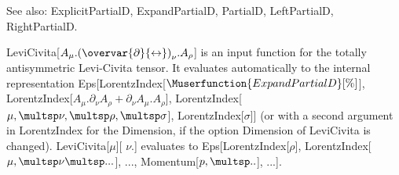 See also:  ExplicitPartialD, ExpandPartialD, PartialD, LeftPartialD, RightPartialD.


\dispSFinmath{
\mu
}

\dispSFoutmath{
\mu
}

\dispSFinmath{
\mu
}


\dispSFinmath{
{{\left( \overvar{\partial }{\leftrightarrow } \right) }_{\mu }}
}


\dispSFinmath{
{{\left( \overvar{\partial }{\leftarrow } \right) }_{\mu }}+{{\left( \overvar{\partial }{\rightarrow } \right) }_{\mu }}
}








LeviCivita[\({A_{\mu }}.{{\left( \overvar{\partial }{\leftrightarrow } \right) }_{\nu }}.{A_{\rho }}\)] is an input function for the totally antisymmetric
Levi-Civita tensor. It evaluates automatically to the internal representation
  Eps[LorentzIndex[\(\Muserfunction{ExpandPartialD}[\%]\)], LorentzIndex[\({A_{\mu }}.{{\partial }_{\nu }}A_{\rho }^{ }+{{\partial }_{\nu }}A_{\mu
}^{ }.{A_{\rho }}\)], LorentzIndex[\(\mu ,\multsp \nu ,\multsp \rho ,\multsp \sigma \)], LorentzIndex[\(\sigma \)]] (or with a second argument
in LorentzIndex for the Dimension, if the option Dimension of LeviCivita is
  changed). LeviCivita[\(\mu \)][ \(\nu \).] evaluates to Eps[LorentzIndex[\(\rho \)], LorentzIndex[\(\mu ,\multsp \nu \multsp ...\)], ..., Momentum[\(p,\multsp
..\)], ...].

